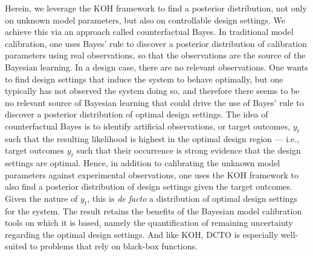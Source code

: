 \documentclass[10pt]{asme2ej}
\begin{document}
%
Herein, we leverage the KOH framework to find a posterior distribution, not only on unknown model parameters, but also on controllable design settings.
%
We achieve this via an approach called counterfactual Bayes.
%
In traditional model calibration, one uses Bayes' rule to discover a posterior distribution of calibration parameters using real observations, so that the observations are the source of the Bayesian learning.
%
In a design case, there are no relevant observations.
%
One wants to find design settings that induce the system to behave optimally, but one typically has not observed the system doing so, and therefore there seems to be no relevant source of Bayesian learning that could drive the use of Bayes' rule to discover a posterior distribution of optimal design settings.
%
The idea of counterfactual Bayes is to identify artificial observations, or target outcomes, $y_t$ such that the resulting likelihood is highest in the optimal design region --- i.e., target outcomes $y_t$ such that their occurrence is strong evidence that the design settings are optimal.
%
Hence, in addition to calibrating the unknown model parameters against experimental observations, one uses the KOH framework to also find a posterior distribution of design settings given the target outcomes.
%
Given the nature of $y_t$, this is \textit{de facto} a distribution of optimal design settings for the system.
%
The result retains the benefits of the Bayesian model calibration tools on which it is based, namely the quantification of remaining uncertainty regarding the optimal design settings.
%
And like KOH, DCTO is especially well-suited to problems that rely on black-box functions.
%
\end{document}
